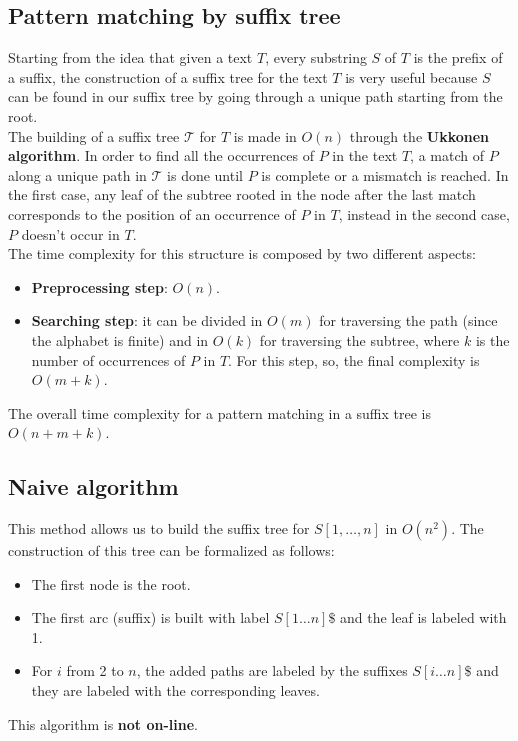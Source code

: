 \subsection{Pattern matching by suffix tree}
Starting from the idea that given a text $T$, every substring $S$ of $T$ is the prefix of a suffix, the construction of a suffix tree for the text $T$ is very useful because $S$ can be found in our suffix tree by going through a unique path starting from the root.\\
The building of a suffix tree $\mathcal{T}$ for $T$ is made in $O(n)$ through the \textbf{Ukkonen algorithm}. In order to find all the occurrences of $P$ in the text $T$, a match of $P$ along a unique path in $\mathcal{T}$ is done until $P$ is complete or a mismatch is reached. In the first case, any leaf of the subtree rooted in the node after the last match corresponds to the position of an occurrence of $P$ in $T$, instead in the second case, $P$ doesn't occur in $T$.\\
The time complexity for this structure is composed by two different aspects:
\begin{itemize}
	\item \textbf{Preprocessing step}: $O(n)$.
	\item \textbf{Searching step}: it can be divided in $O(m)$ for traversing the path (since the alphabet is finite) and in $O(k)$ for traversing the subtree, where $k$ is the number of occurrences of $P$ in $T$. For this step, so, the final complexity is $O(m+k)$.
\end{itemize}
The overall time complexity for a pattern matching in a suffix tree is $O(n+m+k)$. 

\subsection{Naive algorithm}
This method allows us to build the suffix tree for $S[1, \dots, n]$ in $O(n^2)$. The construction of this tree can be formalized as follows:
\begin{itemize}
	\item The first node is the root.
	\item The first arc (suffix) is built with label $S[1 \dots n]\$$ and the leaf is labeled with 1.
	\item For $i$ from 2 to $n$, the added paths are labeled by the suffixes $S[i \dots n]\$$ and they are labeled with the corresponding leaves. 
\end{itemize}
This algorithm is \textbf{not on-line}.

